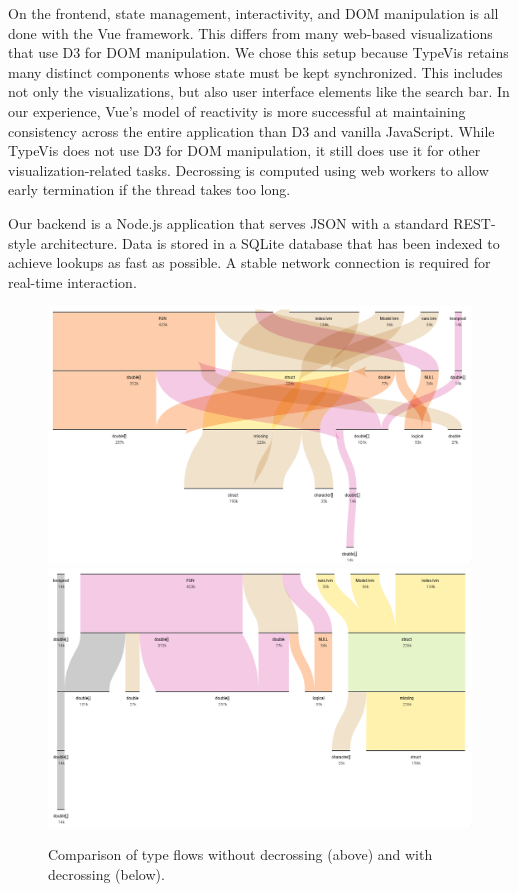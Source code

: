 \documentclass[review]{vgtc}                 %
\newcommand{\typevis}{{\sc TypeVis}\xspace}
\begin{document}
On the frontend, state management, interactivity,
and DOM manipulation is all done with the Vue framework.
This differs from many web-based visualizations
that use D3 for DOM manipulation.
We chose this setup because \typevis retains many distinct
components whose state must be kept synchronized.
This includes not only the visualizations, but also
user interface elements like the search bar.
In our experience, Vue's model of reactivity is
more successful at maintaining consistency across the
entire application than D3 and vanilla JavaScript.
While \typevis does not use D3 for DOM manipulation,
it still does use it for other visualization-related
tasks. Decrossing is computed using web workers
to allow early termination if the thread takes too long.

Our backend is a Node.js application that serves
JSON with a standard REST-style architecture.
Data is stored in a SQLite database that has been
indexed to achieve lookups as fast as possible.
A stable network connection is required for
real-time interaction.

\begin{figure}[tb]
 \centering
 \includegraphics[width=\columnwidth]{img/no_decross.png}
 \includegraphics[width=\columnwidth]{img/decross.png}
 \caption{Comparison of type flows without decrossing (above) and with decrossing (below).}
 \label{fig:decross}
\end{figure}
\end{document}
